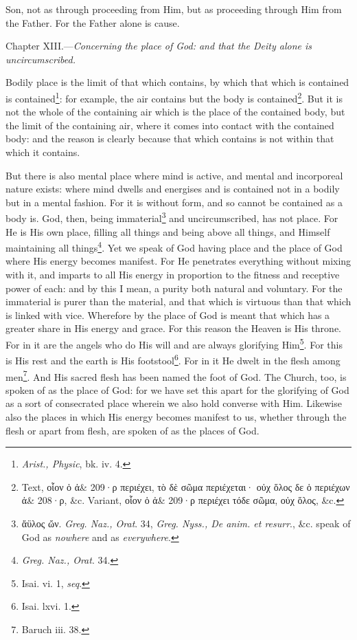 Son, not as through proceeding from Him, but as proceeding through Him from the Father. For the Father alone is cause.


Chapter XIII.—\emph{Concerning the place of God: and that the Deity alone is uncircumscribed.}

Bodily place is the limit of that which contains, by which that which is contained is contained\footnote{\emph{Arist., Physic}, bk. iv. 4.}: for example, the air contains but the body is contained\footnote{Text, \textgreek{οἷον ὁ ἀ\& 209·ρ περιέχει, τὸ δὲ σῶμα περιέχεται· οὐχ ὅλος δε ὁ περιέχων ἀ\& 208·ρ}, \&c. Variant, \textgreek{οἷον ὁ ἀ\& 209·ρ περιέχει τόδε σῶμα, οὐχ ὅλος}, \&c.}. But it is not the whole of the containing air which is the place of the contained body, but the limit of the containing air, where it comes into contact with the contained body: and the reason is clearly because that which contains is not within that which it contains.

But there is also mental place where mind is active, and mental and incorporeal nature exists: where mind dwells and energises and is contained not in a bodily but in a mental fashion. For it is without form, and so cannot be contained as a body is. God, then, being immaterial\footnote{\textgreek{ἄϋλος ὤν}. \emph{Greg. Naz., Orat}. 34, \emph{Greg. Nyss., De anim. et resurr}., \&c. speak of God as \emph{nowhere} and as \emph{everywhere}.} and uncircumscribed, has not place. For He is His own place, filling all things and being above all things, and Himself maintaining all things\footnote{\emph{Greg. Naz., Orat}. 34.}. Yet we speak of God having place and the place of God where His energy becomes manifest. For He penetrates everything without mixing with it, and imparts to all His energy in proportion to the fitness and receptive power of each: and by this I mean, a purity both natural and voluntary. For the immaterial is purer than the material, and that which is virtuous than that which is linked with vice. Wherefore by the place of God is meant that which has a greater share in His energy and grace. For this reason the Heaven is His throne. For in it are the angels who do His will and are always glorifying Him\footnote{Isai. vi. 1, \emph{seq}.}. For this is His rest and the earth is His footstool\footnote{Isai. lxvi. 1.}. For in it He dwelt in the flesh among men\footnote{Baruch iii. 38.}. And His sacred flesh has been named the foot of God. The Church, too, is spoken of as the place of God: for we have set this apart for the glorifying of God as a sort of consecrated place wherein we also hold converse with Him. Likewise also the places in which His energy becomes manifest to us, whether through the flesh or apart from flesh, are spoken of as the places of God.


